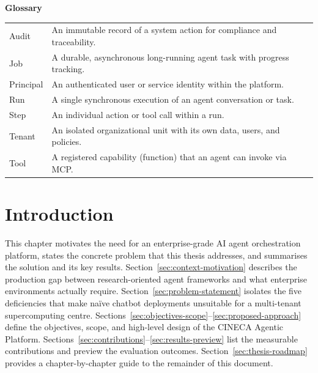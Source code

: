 \documentclass[a4paper,noexaminfo]{sapthesis}
\begin{document}
\vspace{0.8cm}
\noindent\textbf{\large Glossary}
\vspace{0.3cm}

\noindent\begin{tabularx}{\textwidth}{@{}l X@{}}
Audit     & An immutable record of a system action for compliance and traceability. \\
Job       & A durable, asynchronous long-running agent task with progress tracking. \\
Principal & An authenticated user or service identity within the platform. \\
Run       & A single synchronous execution of an agent conversation or task. \\
Step      & An individual action or tool call within a run. \\
Tenant    & An isolated organizational unit with its own data, users, and policies. \\
Tool      & A registered capability (function) that an agent can invoke via MCP. \\
\end{tabularx}


\mainmatter


\chapter{Introduction}
\label{ch:introduction}

This chapter motivates the need for an enterprise-grade AI agent orchestration
platform, states the concrete problem that this thesis addresses, and
summarises the solution and its key results.  Section~\ref{sec:context-motivation}
describes the production gap between research-oriented agent frameworks and
what enterprise environments actually require.
Section~\ref{sec:problem-statement} isolates the five deficiencies that make
na\"ive chatbot deployments unsuitable for a multi-tenant supercomputing
centre.  Sections~\ref{sec:objectives-scope}--\ref{sec:proposed-approach}
define the objectives, scope, and high-level design of the CINECA Agentic
Platform.  Sections~\ref{sec:contributions}--\ref{sec:results-preview}
list the measurable contributions and preview the evaluation outcomes.
Section~\ref{sec:thesis-roadmap} provides a chapter-by-chapter guide to the
remainder of this document.
\end{document}
